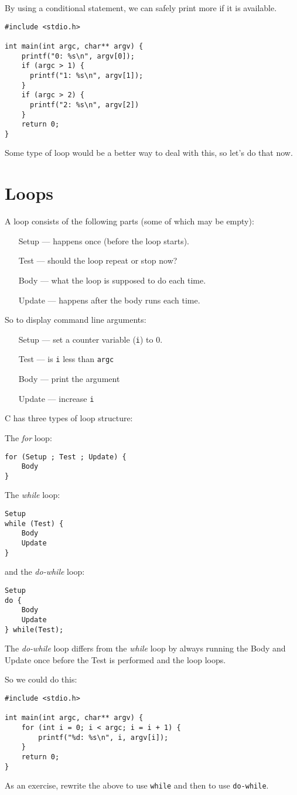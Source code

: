 By using a conditional statement, we can safely print more if it is available.
\begin{lstlisting}
#include <stdio.h>

int main(int argc, char** argv) {
    printf("0: %s\n", argv[0]);
    if (argc > 1) {
      printf("1: %s\n", argv[1]);    
    }
    if (argc > 2) {
      printf("2: %s\n", argv[2])
    }
    return 0;
}
\end{lstlisting}
Some type of loop would be a better way to deal with this, so let's do that now.

\section{Loops}
A loop consists of the following parts (some of which may be empty):
\begin{itemize}
 \item [Setup] --- happens once (before the loop starts).
 \item [Test]  --- should the loop repeat or stop now?
 \item [Body]  --- what the loop is supposed to do each time.
 \item [Update] --- happens after the body runs each time.
\end{itemize}

So to display command line arguments:
\begin{itemize}
 \item [Setup] --- set a counter variable (\texttt{i}) to 0.
 \item [Test]  --- is \texttt{i} less than \texttt{argc}
 \item [Body]  --- print the argument
 \item [Update] --- increase \texttt{i}
\end{itemize}

C has three types of loop structure:

The \emph{for} loop:
\begin{lstlisting}
for (Setup ; Test ; Update) {
    Body
}
\end{lstlisting}

The \emph{while} loop:
\begin{lstlisting}
Setup
while (Test) {
    Body
    Update
}
\end{lstlisting}

and the \emph{do-while} loop:
\begin{lstlisting}
Setup
do {
    Body
    Update
} while(Test);
\end{lstlisting}

The \emph{do-while} loop differs from the \emph{while} loop by always running the Body and Update once before the Test is performed and the loop loops.

So we could do this:
\begin{lstlisting}
#include <stdio.h>

int main(int argc, char** argv) {
    for (int i = 0; i < argc; i = i + 1) {
        printf("%d: %s\n", i, argv[i]);
    }
    return 0;
}
\end{lstlisting}

As an exercise, rewrite the above to use \texttt{while} and then to use \texttt{do-while}.
